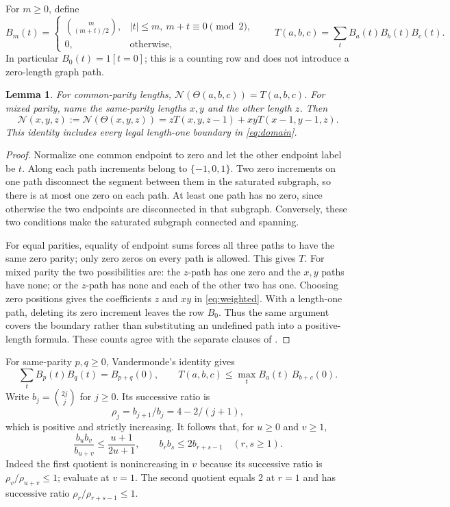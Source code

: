 \documentclass[11pt]{article}
\newtheorem{lemma}[theorem]{Lemma}
\theoremstyle{remark}
\newcommand{\Th}{\Theta}
\newcommand{\N}{\mathcal N}
\begin{document}
For $m\ge0$, define
\[
 B_m(t)=\begin{cases}
 \binom m{(m+t)/2},& |t|\le m,\ m+t\equiv0\pmod2,\\
 0,&\text{otherwise},
 \end{cases}
 \qquad T(a,b,c)=\sum_tB_a(t)B_b(t)B_c(t).
\]
In particular $B_0(t)=1[t=0]$; this is a counting row and does not
introduce a zero-length graph path.

\begin{lemma}\label{lem:count}
For common-parity lengths, $\N(\Th(a,b,c))=T(a,b,c)$. For mixed parity,
name the same-parity lengths $x,y$ and the other length $z$. Then
\begin{equation}\label{eq:weighted}
 \N(x,y,z):=\N(\Th(x,y,z))
 =zT(x,y,z-1)+xyT(x-1,y-1,z).
\end{equation}
This identity includes every legal length-one boundary in
\eqref{eq:domain}.
\end{lemma}
\begin{proof}
Normalize one common endpoint to zero and let the other endpoint label
be $t$. Along each path increments belong to $\{-1,0,1\}$. Two zero
increments on one path disconnect the segment between them in the
saturated subgraph, so there is at most one zero on each path. At least
one path has no zero, since otherwise the two endpoints are disconnected
in that subgraph. Conversely, these two conditions make the saturated
subgraph connected and spanning.

For equal parities, equality of endpoint sums forces all three paths to
have the same zero parity; only zero zeros on every path is allowed.
This gives $T$. For mixed parity the two possibilities are: the $z$-path
has one zero and the $x,y$ paths have none; or the $z$-path has none and
each of the other two has one. Choosing zero positions gives the
coefficients $z$ and $xy$ in \eqref{eq:weighted}. With a length-one path,
deleting its zero increment leaves the row $B_0$. Thus the same argument
covers the boundary rather than substituting an undefined path into a
positive-length formula. These counts agree with the separate clauses
of \cite[Corollary 25]{BB}.
\end{proof}

For same-parity $p,q\ge0$, Vandermonde's identity gives
\begin{equation}\label{eq:vander}
 \sum_t B_p(t)B_q(t)=B_{p+q}(0),\qquad
 T(a,b,c)\le \max_tB_a(t)\,B_{b+c}(0).
\end{equation}
Write $b_j=\binom{2j}{j}$ for $j\ge0$. Its successive ratio is
\begin{equation}\label{eq:rho}
 \rho_j=b_{j+1}/b_j=4-2/(j+1),
\end{equation}
which is positive and strictly increasing. It follows that, for $u\ge0$
and $v\ge1$,
\begin{equation}\label{eq:product}
 \frac{b_ub_v}{b_{u+v}}\le\frac{u+1}{2u+1},\qquad
 b_rb_s\le2b_{r+s-1}\quad(r,s\ge1).
\end{equation}
Indeed the first quotient is nonincreasing in $v$ because its successive
ratio is $\rho_v/\rho_{u+v}\le1$; evaluate at $v=1$. The second quotient
equals 2 at $r=1$ and has successive ratio $\rho_r/\rho_{r+s-1}\le1$.
\end{document}
